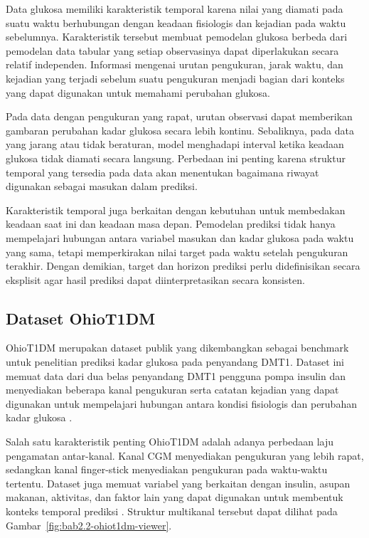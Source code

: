 Data glukosa memiliki karakteristik temporal karena nilai yang diamati pada suatu waktu berhubungan dengan keadaan fisiologis dan kejadian pada waktu sebelumnya. Karakteristik 
tersebut membuat pemodelan glukosa berbeda dari pemodelan data tabular yang setiap observasinya dapat diperlakukan secara relatif independen. Informasi mengenai urutan 
pengukuran, jarak waktu, dan kejadian yang terjadi sebelum suatu pengukuran menjadi bagian dari konteks yang dapat digunakan untuk memahami perubahan glukosa.

Pada data dengan pengukuran yang rapat, urutan observasi dapat memberikan gambaran perubahan kadar glukosa secara lebih kontinu. Sebaliknya, pada data yang jarang atau tidak 
beraturan, model menghadapi interval ketika keadaan glukosa tidak diamati secara langsung. Perbedaan ini penting karena struktur temporal yang tersedia pada data akan 
menentukan bagaimana riwayat digunakan sebagai masukan dalam prediksi.

Karakteristik temporal juga berkaitan dengan kebutuhan untuk membedakan keadaan saat ini dan keadaan masa depan. Pemodelan prediksi tidak hanya mempelajari hubungan antara 
variabel masukan dan kadar glukosa pada waktu yang sama, tetapi memperkirakan nilai target pada waktu setelah pengukuran terakhir. Dengan demikian, target dan horizon prediksi 
perlu didefinisikan secara eksplisit agar hasil prediksi dapat diinterpretasikan secara konsisten.

\subsection{Dataset OhioT1DM}
\label{subsec:bab2-ohiot1dm}

OhioT1DM merupakan dataset publik yang dikembangkan sebagai benchmark untuk penelitian prediksi kadar glukosa pada penyandang DMT1. Dataset ini memuat data dari dua belas 
penyandang DMT1 pengguna pompa insulin dan menyediakan beberapa kanal pengukuran serta catatan kejadian yang dapat digunakan untuk mempelajari hubungan antara kondisi 
fisiologis dan perubahan kadar glukosa \parencite{marling2020}.

Salah satu karakteristik penting OhioT1DM adalah adanya perbedaan laju pengamatan antar-kanal. Kanal CGM menyediakan pengukuran yang lebih rapat, sedangkan kanal finger-stick 
menyediakan pengukuran pada waktu-waktu tertentu. Dataset juga memuat variabel yang berkaitan dengan insulin, asupan makanan, aktivitas, dan faktor lain yang dapat digunakan 
untuk membentuk konteks temporal prediksi \parencite{marling2020}. Struktur multikanal tersebut dapat dilihat pada Gambar~\ref{fig:bab2.2-ohiot1dm-viewer}.

